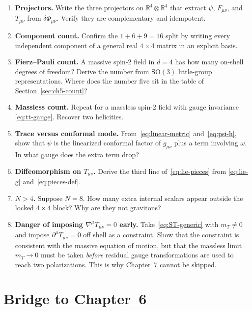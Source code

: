 \begin{enumerate}
  \item \textbf{Projectors.}
    Write the three projectors on \(\mathbb{R}^4\otimes\mathbb{R}^4\)
    that extract \(\psi\), \(F_{\mu\nu}\), and \(T_{\mu\nu}\) from
    \(\delta\Phi_{\mu\nu}\). Verify they are complementary and
    idempotent.
  \item \textbf{Component count.}
    Confirm the \(1+6+9=16\) split by writing every independent
    component of a general real \(4\times 4\) matrix in an explicit
    basis.
  \item \textbf{Fierz--Pauli count.}
    A massive spin-2 field in \(d=4\) has how many on-shell degrees
    of freedom? Derive the number from \(\mathrm{SO}(3)\) little-group
    representations. Where does the number five sit in the table of
    Section~\ref{sec:ch5-count}?
  \item \textbf{Massless count.}
    Repeat for a massless spin-2 field with gauge invariance
    \eqref{eq:tt-gauge}. Recover two helicities.
  \item \textbf{Trace versus conformal mode.}
    From~\eqref{eq:linear-metric} and~\eqref{eq:psi-h}, show that
    \(\psi\) is the linearized conformal factor of \(g_{\mu\nu}\)
    plus a term involving \(\omega\). In what gauge does the extra
    term drop?
  \item \textbf{Diffeomorphism on \(T_{\mu\nu}\).}
    Derive the third line of~\eqref{eq:lie-pieces} from
    \eqref{eq:lie-g} and~\eqref{eq:pieces-def}.
  \item \textbf{\(N>4\).}
    Suppose \(N=8\). How many extra internal scalars appear outside
    the locked \(4\times 4\) block? Why are they not gravitons?
  \item \textbf{Danger of imposing \(\nabla^\mu T_{\mu\nu}=0\) early.}
    Take~\eqref{eq:ST-generic} with \(m_T\neq 0\) and impose
    \(\partial^\mu T_{\mu\nu}=0\) off shell as a constraint. Show
    that the constraint is consistent with the massive equation of
    motion, but that the massless limit \(m_T\to 0\) must be taken
    \emph{before} residual gauge transformations are used to reach
    two polarizations. This is why Chapter~7 cannot be skipped.
\end{enumerate}

\section{Bridge to Chapter~6}
\label{sec:ch5-bridge}

